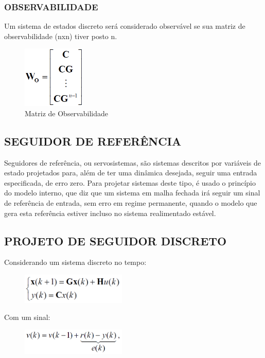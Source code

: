 \documentclass[a4paper,12pt]{article}
\begin{document}
\subsubsection{OBSERVABILIDADE}
Um sistema de estados discreto será considerado observável se sua matriz de observabilidade (nxn) tiver posto n.

\begin{figure}[H]
\centering
\includegraphics[width=3cm]{imagens-6/21.png}
\caption{Matriz de Observabilidade}
\end{figure}

\subsection{SEGUIDOR DE REFERÊNCIA}
\hspace{4ex}Seguidores de referência, ou servosistemas, são sistemas descritos por variáveis de estado projetados para, além de ter uma dinâmica desejada, seguir uma entrada especificada, de erro zero. Para projetar sistemas deste tipo, é usado o princípio do modelo interno, que diz que um sistema em malha fechada irá seguir um sinal de referência de entrada, sem erro em regime permanente, quando o modelo que gera esta referência estiver incluso no sistema realimentado estável.

\subsection{PROJETO DE SEGUIDOR DISCRETO}

\hspace{4ex}Considerando um sistema discreto no tempo:
\begin{figure}[H]
\centering
\includegraphics[width=5cm]{imagens-6/1.png}
\end{figure}


Com um sinal:
\begin{figure}[H]
\centering
\includegraphics[width=5cm]{imagens-6/2.png}
\end{figure}
\end{document}
